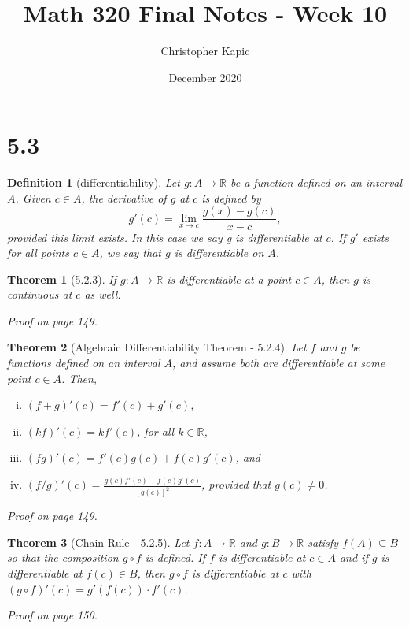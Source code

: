 \documentclass{article}
\title{Math 320 Final Notes - Week 10}
\author{Christopher Kapic}
\date{December 2020}
\newtheorem{definition}{Definition}
\newtheorem{theorem}{Theorem}
\begin{document}
\maketitle

\section*{5.3}

\begin{definition}[differentiability]
    Let $g : A\rightarrow \mathbb{R}$ be a function defined on an interval $A$. Given $c \in A$, the \textit{derivative} of $g$ at $c$ is defined by \[g'(c)=\lim _{x \rightarrow c} \frac{g(x)-g(c)}{x-c},\] provided this limit exists. In this case we say \textit{g is differentiable at} $c$. If $g'$ exists for all points $c \in A$, we say that $g$ is \textit{differentiable} on $A$.
\end{definition}

\begin{theorem}[5.2.3]
    If $g:A\rightarrow\mathbb{R}$ is differentiable at a point $c \in A$, then $g$ is continuous at $c$ as well.

    Proof on page 149.
\end{theorem}

\begin{theorem}[Algebraic Differentiability Theorem - 5.2.4]
    Let $f$ and $g$ be functions defined on an interval $A$, and assume both are differentiable at some point $c \in A$. Then,
    \begin{enumerate}[(i)]
        \item $(f+g)'(c)=f'(c)+g'(c)$,
        \item $(kf)'(c)=kf'(c)$, for all $k \in \mathbb{R}$,
        \item $(fg)'(c)=f'(c)g(c)+f(c)g'(c)$, and
        \item $(f/g)'(c)=\frac{g(c)f'(c)-f(c)g'(c)}{[g(c)]^2}$, provided that $g(c)\neq 0$.
    \end{enumerate}

    Proof on page 149.
\end{theorem}

\begin{theorem}[Chain Rule - 5.2.5]
    Let $f:A\rightarrow \mathbb{R}$ and $g:B\rightarrow \mathbb{R}$ satisfy $f(A) \subseteq B$ so that the composition $g \circ f$ is defined. If $f$ is differentiable at $c \in A$ and if $g$ is differentiable at $f(c)\in B$, then $g \circ f$ is differentiable at $c$ with $(g \circ f)'(c)=g'(f(c))\cdot f'(c)$.

    Proof on page 150.
\end{theorem}
\end{document}
